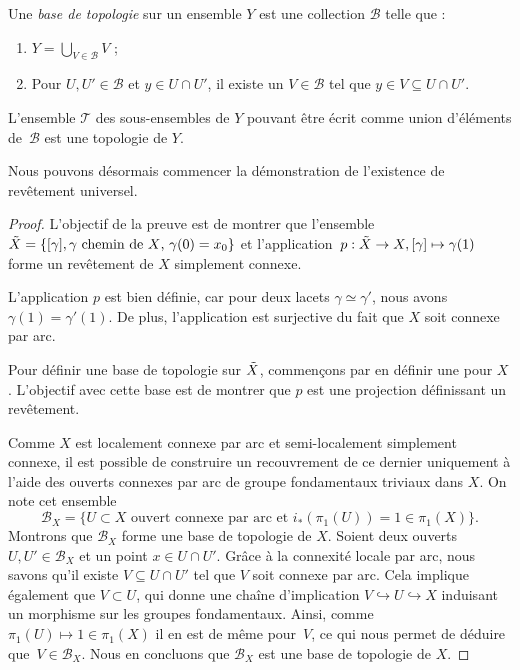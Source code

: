 \begin{definition}
Une \emph{base de topologie} sur un ensemble $Y$ est une collection $\mathcal{B}$ telle que :\begin{enumerate}
    \item $Y=\bigcup_{V\in \mathcal{B}}V$ ;
    \item Pour $U,U'\in \mathcal{B}$ et $y\in U\cap U'$, il existe un $V\in\mathcal{B}$ tel que $y\in V\subseteq U\cap U'$.
\end{enumerate}
L'ensemble $\mathcal{T}$ des sous-ensembles de $Y$ pouvant être écrit comme union d'éléments de~$\mathcal{B}$ est une topologie de $Y$.
\end{definition}
Nous pouvons désormais commencer la démonstration de l'existence de revêtement universel.
\begin{proof}
L'objectif de la preuve est de montrer que l'ensemble $\Tilde{X}=\{[\gamma],\gamma\text{ chemin de $X$, $\gamma(0)=x_0$}\}$ et l'application~${p:\Tilde{X}\to X, [\gamma]\mapsto\gamma(1)}$ forme un revêtement de $X$ simplement connexe.

L'application $p$ est bien définie, car pour deux lacets $\gamma\simeq\gamma'$, nous avons $\gamma(1)=\gamma'(1)$. De plus, l'application est surjective du fait que $X$ soit connexe par arc.

\bigskip Pour définir une base de topologie sur $\Tilde{X}$, commençons par en définir une pour $X$. L'objectif avec cette base est de montrer que $p$ est une projection définissant un revêtement.

Comme $X$ est localement connexe par arc et semi-localement simplement connexe, il est possible de construire un recouvrement de ce dernier uniquement à l'aide des ouverts connexes par arc de groupe fondamentaux triviaux dans $X$. On note cet ensemble \[\mathcal{B}_X=\{U\subset X \text{ ouvert connexe par arc et } i_\ast(\pi_1(U))=1\in\pi_1(X)\}.\]Montrons que $\mathcal{B}_X$ forme une base de topologie de $X$. Soient deux ouverts $U,U'\in\mathcal{B}_X$ et un point $x\in U\cap U'$. Grâce à la connexité locale par arc, nous savons qu'il existe $V\subseteq U\cap U'$ tel que $V$ soit connexe par arc. Cela implique également que $V\subset U$, qui donne une chaîne d'implication $V\hookrightarrow U\hookrightarrow X$ induisant un morphisme sur les groupes fondamentaux. Ainsi, comme $\pi_1(U)\mapsto 1\in \pi_1(X)$ il en est de même pour~$V$, ce qui nous permet de déduire que~$V\in \mathcal{B}_X$. Nous en concluons que $\mathcal{B}_X$ est une base de topologie de $X$.


\end{proof}
